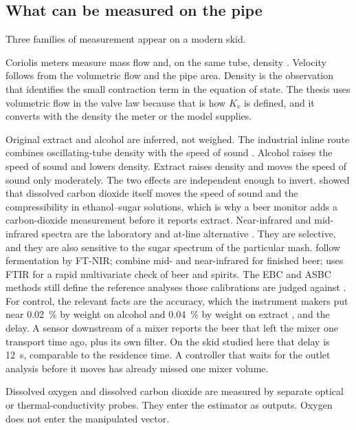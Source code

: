 \subsection{What can be measured on the pipe}

Three families of measurement appear on a modern skid.

Coriolis meters measure mass flow and, on the same tube, density \citep{wang2014}. Velocity follows from the volumetric flow and the pipe area. Density is the observation that identifies the small contraction term in the equation of state. The thesis uses volumetric flow in the valve law because that is how $K_v$ is defined, and it converts with the density the meter or the model supplies.

Original extract and alcohol are inferred, not weighed. The industrial inline route combines oscillating-tube density with the speed of sound \citep{antonpaar2024,schoeck2012}. Alcohol raises the speed of sound and lowers density. Extract raises density and moves the speed of sound only moderately. The two effects are independent enough to invert. \citet{schoeck2012} showed that dissolved carbon dioxide itself moves the speed of sound and the compressibility in ethanol--sugar solutions, which is why a beer monitor adds a carbon-dioxide measurement before it reports extract. Near-infrared and mid-infrared spectra are the laboratory and at-line alternative \citep{siesler2002,lachenmeier2007,inon2006,grassi2014}. They are selective, and they are also sensitive to the sugar spectrum of the particular mash. \citet{grassi2014} follow fermentation by FT-NIR; \citet{inon2006} combine mid- and near-infrared for finished beer; \citet{lachenmeier2007} uses FTIR for a rapid multivariate check of beer and spirits. The EBC and ASBC methods still define the reference analyses those calibrations are judged against \citep{ebcanalytica,asbc2014,mebak2013}. For control, the relevant facts are the accuracy, which the instrument makers put near \SI{0.02}{\percent} by weight on alcohol and \SI{0.04}{\percent} by weight on extract \citep{antonpaar2024}, and the delay. A sensor downstream of a mixer reports the beer that left the mixer one transport time ago, plus its own filter. On the skid studied here that delay is \SI{12}{\second}, comparable to the residence time. A controller that waits for the outlet analysis before it moves has already missed one mixer volume.

Dissolved oxygen and dissolved carbon dioxide are measured by separate optical or thermal-conductivity probes. They enter the estimator as outputs. Oxygen does not enter the manipulated vector.


